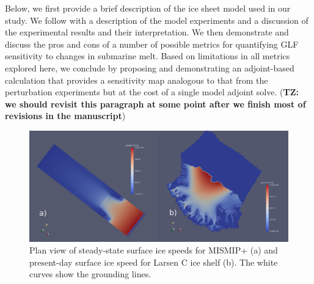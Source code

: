 \documentclass[review,oneside]{igs}
\begin{document}

Below, we first provide a brief description of the ice sheet model used in our study. We follow with a description of the model experiments and a discussion of the experimental results and their interpretation. We then demonstrate and discuss the pros and cons of a number of possible metrics for quantifying GLF sensitivity to changes in submarine melt. Based on limitations in all metrics explored here, we conclude by proposing and demonstrating an adjoint-based calculation that provides a sensitivity map analogous to that from the \cite{reese2018} perturbation experiments but at the cost of a single model adjoint solve. ({\bf{TZ: we should revisit this paragraph at some point after we finish most of revisions in the manuscript}})

\begin{figure}
\centering
\includegraphics[width=1\linewidth]{figs/fig1.pdf}
\caption{Plan view of steady-state surface ice speeds for MISMIP+ (a) and present-day surface ice speed for Larsen C ice shelf (b). The white curves show the grounding lines.}
\label{fig1}
\end{figure}
\end{document}
